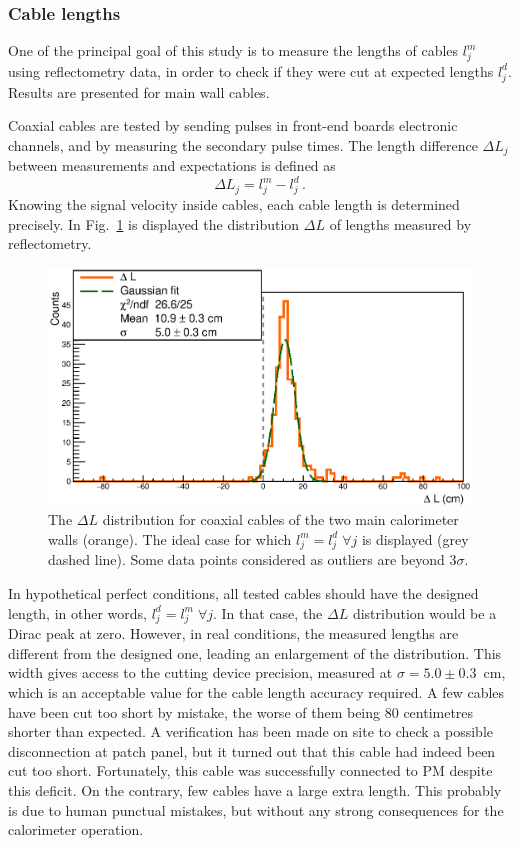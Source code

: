 \subsubsection*{Cable lengths}

One of the principal goal of this study is to measure the lengths of cables $l^{m}_{j}$ using reflectometry data, in order to check if they were cut at expected lengths $l^{d}_{j}$.
Results are presented for main wall cables.

Coaxial cables are tested by sending pulses in front-end boards electronic channels, and by measuring the secondary pulse times.
The length difference $\Delta L_{j}$ between measurements and expectations is defined as
\begin{equation}
  \Delta L_{j} = l^{m}_{j}-l^{d}_{j}\,.
\end{equation}
Knowing the signal velocity inside cables, each cable length is determined precisely.
In Fig.~\ref{fig:LengthDiff} is displayed the distribution $\Delta L$ of lengths measured by reflectometry.
\begin{figure}[h!]
  \centering
  \includegraphics[width=15cm]{commissioning/fig_commissioning/length_diff.eps}
  \caption{The $\Delta L$ distribution for coaxial cables of the two main calorimeter walls (orange).
    The ideal case for which $l^{m}_{j} = l^{d}_{j} \;\forall j$ is displayed (grey dashed line).
    Some data points considered as outliers are beyond $3\sigma$.
    \label{fig:LengthDiff}}
\end{figure}
In hypothetical perfect conditions, all tested cables should have the designed length, in other words, $l^{d}_{j} = l^{m}_{j} \;\forall j$.
In that case, the $\Delta L$ distribution would be a Dirac peak at zero.
However, in real conditions, the measured lengths are different from the designed one, leading an enlargement of the distribution.
This width gives access to the cutting device precision, measured at $\sigma=5.0\pm0.3$~cm, which is an acceptable value for the cable length accuracy required.
A few cables have been cut too short by mistake, the worse of them being $80$ centimetres shorter than expected.
A verification has been made on site to check a possible disconnection at patch panel, but it turned out that this cable had indeed been cut too short.
Fortunately, this cable  was successfully connected to PM despite this deficit.
On the contrary, few cables have a large extra length.
This probably is due to human punctual mistakes, but without any strong consequences for the calorimeter operation.

